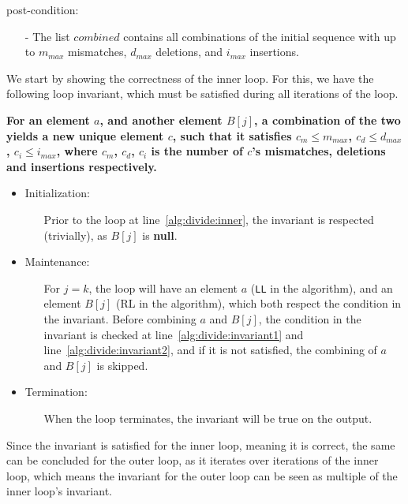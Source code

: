\documentclass[12pt]{article}
\theoremstyle{definition}
\begin{document}
post-condition:
\begin{itemize}
\item[-] The list $combined$ contains all combinations of the initial sequence with up to  $m_{max}$ mismatches, $d_{max}$ deletions, and $i_{max}$ insertions.
\end{itemize}


We start by showing the correctness of the inner loop. For this, we have the following loop invariant, which must be satisfied during all iterations of the loop.

\textbf{For an element $a$, and another element $B[j]$, a combination of the two yields a new unique element $c$, such that it satisfies $c_m \leq m_{max}$, $c_d \leq d_{max}$, $c_i \leq i_{max}$, where $c_m$, $c_d$, $c_i$ is the number of $c$'s mismatches, deletions and insertions respectively.}

\begin{itemize}
\item Initialization:
\begin{itemize}
	\item[] Prior to the loop at line~\ref{alg:divide:inner}, the invariant is respected (trivially), as $B[j]$ is \textbf{null}.
\end{itemize}

\item Maintenance:
\begin{itemize}
	\item[] For $j = k$, the loop will have an element $a$ (\texttt{LL} in the algorithm), and an element $B[j]$ (RL in the algorithm), which both respect the condition in the invariant. Before combining $a$ and $B[j]$, the condition in the invariant is checked at line~\ref{alg:divide:invariant1} and line~\ref{alg:divide:invariant2}, and if it is not satisfied, the combining of $a$ and $B[j]$ is skipped.
\end{itemize}

\item Termination:
\begin{itemize}
	\item[] When the loop terminates, the invariant will be true on the output.
\end{itemize}
\end{itemize}

Since the invariant is satisfied for the inner loop, meaning it is correct, the same can be concluded for the outer loop, as it iterates over iterations of the inner loop, which means the invariant for the outer loop can be seen as multiple of the inner loop's invariant.
\end{document}
